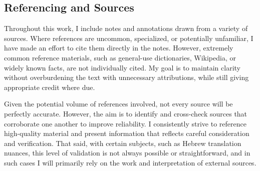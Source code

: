 \medskip

\medskip





\subsection*{Referencing and Sources}

Throughout this work, I include notes and annotations drawn from a variety of sources. Where references are uncommon, specialized, or potentially unfamiliar, I have made an effort to cite them directly in the notes. However, extremely common reference materials, such as general-use dictionaries, Wikipedia, or widely known facts, are not individually cited. My goal is to maintain clarity without overburdening the text with unnecessary attributions, while still giving appropriate credit where due.

\tab Given the potential volume of references involved, not every source will be perfectly accurate. However, the aim is to identify and cross-check sources that corroborate one another to improve reliability. I consistently strive to reference high-quality material and present information that reflects careful consideration and verification. That said, with certain subjects, such as Hebrew translation nuances, this level of validation is not always possible or straightforward, and in such cases I will primarily rely on the work and interpretation of external sources.
